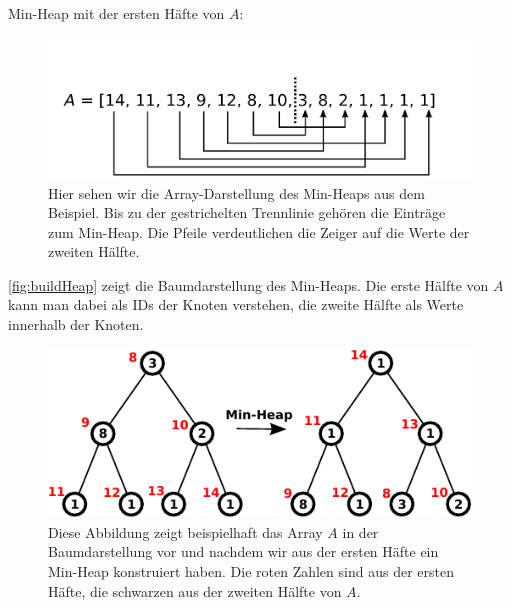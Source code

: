 \documentclass[a4paper,11pt]{scrartcl}%
\theoremstyle{change}
\theoremstyle{nonumberplain}
\theoremstyle{change}
\theoremstyle{nonumberplain}
\theoremstyle{change}
\theoremstyle{nonumberplain}
\begin{document}
Min-Heap mit der ersten Häfte von $A$:

\begin{figure}
	\begin{center}
		\includegraphics[scale=0.3]{./pics/A_heap}
		\caption{Hier sehen wir die Array-Darstellung des Min-Heaps aus dem Beispiel. Bis zu der gestrichelten Trennlinie gehören die Einträge zum Min-Heap. Die Pfeile verdeutlichen die Zeiger auf die Werte der zweiten Hälfte.}
		\label{A_heap}
	\end{center}
\end{figure}
\newpage
\autoref{fig:buildHeap} zeigt die Baumdarstellung des Min-Heaps. Die erste Hälfte von $A$ kann man dabei als IDs der Knoten verstehen, die zweite Hälfte als Werte innerhalb der Knoten.\cite[S. 342]{managingGigabytes}

\begin{figure}[h]
\centering
	  \includegraphics[scale=0.9]{./pics/build-Heap}
	  \caption{Diese Abbildung zeigt beispielhaft das Array $A$ in der Baumdarstellung vor und nachdem wir aus der ersten Häfte ein Min-Heap konstruiert haben. Die roten Zahlen sind aus der ersten Häfte, die schwarzen aus der zweiten Hälfte von $A$.}
	  \label{fig:buildHeap}
\end{figure}
\end{document}
